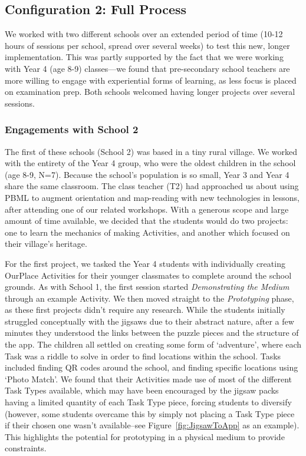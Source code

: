 \documentclass[,hyphens]{sigchi}
\begin{document}
\subsection{Configuration 2: Full Process}
We worked with two different schools over an extended period of time (10-12 hours of sessions per school, spread over several weeks) to test this new, longer implementation. This was partly supported by the fact that we were working with Year 4 (age 8-9) classes---we found that pre-secondary school teachers are more willing to engage with experiential forms of learning, as less focus is placed on examination prep. Both schools welcomed having longer projects over several sessions.

\subsubsection{Engagements with School 2}
The first of these schools (School 2) was based in a tiny rural village. We worked with the entirety of the Year 4 group, who were the oldest children in the school (age 8-9, N=7). Because the school's population is so small, Year 3 and Year 4 share the same classroom. The class teacher (T2) had approached us about using PBML to augment orientation and map-reading with new technologies in lessons, after attending one of our related workshops. With a generous scope and large amount of time available, we decided that the students would do two projects: one to learn the mechanics of making Activities, and another which focused on their village's heritage. 

For the first project, we tasked the Year 4 students with individually creating OurPlace Activities for their younger classmates to complete around the school grounds. As with School 1, the first session started \textit{Demonstrating the Medium} through an example Activity. We then moved straight to the \textit{Prototyping} phase, as these first projects didn't require any research. While the students initially struggled conceptually with the jigsaws due to their abstract nature, after a few minutes they understood the links between the puzzle pieces and the structure of the app. The children all settled on creating some form of `adventure', where each Task was a riddle to solve in order to find locations within the school. Tasks included finding QR codes around the school, and finding specific locations using `Photo Match'. We found that their Activities made use of most of the different Task Types available, which may have been encouraged by the jigsaw packs having a limited quantity of each Task Type piece, forcing students to diversify (however, some students overcame this by simply not placing a Task Type piece if their chosen one wasn't available--see Figure~\ref{fig:JigsawToApp} as an example). This highlights the potential for prototyping in a physical medium to provide constraints.
\end{document}
